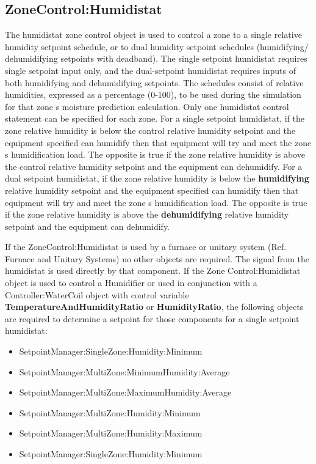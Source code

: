 \subsection{ZoneControl:Humidistat}\label{zonecontrolhumidistat}

The humidistat zone control object is used to control a zone to a single relative humidity setpoint schedule, or to dual humidity setpoint schedules (humidifying/ dehumidifying setpoints with deadband). The single setpoint humidistat requires single setpoint input only, and the dual-setpoint humidistat requires inputs of both humidifying and dehumidifying setpoints. The schedules consist of relative humidities, expressed as a percentage (0-100), to be used during the simulation for that zone s moisture prediction calculation. Only one humidistat control statement can be specified for each zone. For a single setpoint humidistat, if the zone relative humidity is below the control relative humidity setpoint and the equipment specified can humidify then that equipment will try and meet the zone s humidification load. The opposite is true if the zone relative humidity is above the control relative humidity setpoint and the equipment can dehumidify. For a dual setpoint humidistat, if the zone relative humidity is below the \textbf{humidifying} relative humidity setpoint and the equipment specified can humidify then that equipment will try and meet the zone s humidification load. The opposite is true if the zone relative humidity is above the \textbf{dehumidifying} relative humidity setpoint and the equipment can dehumidify.

If the ZoneControl:Humidistat is used by a furnace or unitary system (Ref. Furnace and Unitary Systems) no other objects are required. The signal from the humidistat is used directly by that component. If the Zone Control:Humidistat object is used to control a Humidifier or used in conjunction with a Controller:WaterCoil object with control variable \textbf{TemperatureAndHumidityRatio} or \textbf{HumidityRatio}, the following objects are required to determine a setpoint for those components for a single setpoint humidistat:

\begin{itemize}
\item
  SetpointManager:SingleZone:Humidity:Minimum
\item
  SetpointManager:MultiZone:MinimumHumidity:Average
\item
  SetpointManager:MultiZone:MaximumHumidity:Average
\item
  SetpointManager:MultiZone:Humidity:Minimum
\item
  SetpointManager:MultiZone:Humidity:Maximum
\item
  SetpointManager:SingleZone:Humidity:Minimum
\end{itemize}

